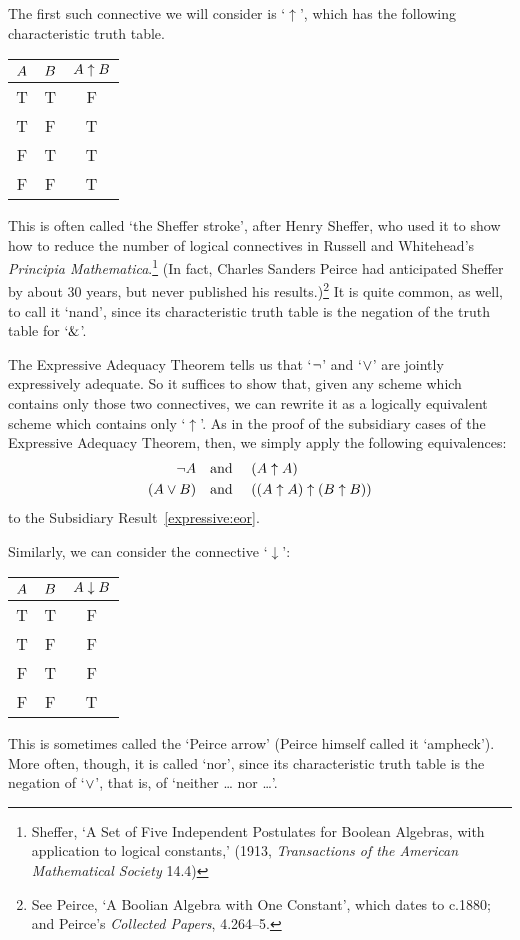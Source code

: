 The first such connective we will consider is `$\uparrow$', which has the following characteristic truth table.
\begin{center}
\begin{tabular}{c c | c}
$A$ & $B$ & $A \mathrel{\uparrow} B$\\
\hline
 T & T & F \\
 T & F & T \\
 F & T & T  \\
 F & F & T
\end{tabular}
\end{center}
 This is often called `the Sheffer stroke', after Henry Sheffer, who used it to show how to reduce the number of logical connectives in Russell and Whitehead's \emph{Principia Mathematica}.\footnote{Sheffer, `A Set of Five Independent Postulates for Boolean Algebras, with application to logical constants,' (1913, \emph{Transactions of the American Mathematical Society} 14.4)} (In fact, Charles Sanders Peirce had anticipated Sheffer by about 30 years, but never published his results.)\footnote{See Peirce, `A Boolian Algebra with One Constant', which dates to c.1880; and Peirce's \emph{Collected Papers}, 4.264--5.} It is quite common, as well, to call it `nand', since its characteristic truth table is the negation of the truth table for `$\mathbin{\&}$'.

The Expressive Adequacy Theorem tells us that `$\neg$' and `$\vee$' are jointly expressively adequate. So it suffices to show that, given any scheme which contains only those two connectives, we can rewrite it as a logically equivalent scheme which contains only `$\uparrow$'. As in the proof of the subsidiary cases of the Expressive Adequacy Theorem, then, we simply apply the following equivalences:
		\begin{align*}
			\neg A &\text{\quad and \quad} (A \uparrow A)\\
			(A \vee B) & \text{\quad and \quad} ((A \uparrow A) \uparrow (B \uparrow B))
		\end{align*}
to the Subsidiary Result~\ref{expressive:eor}.

Similarly, we can consider the connective `$\downarrow$':
\begin{center}
\begin{tabular}{c c | c}
$A$ & $B$ & $A \mathrel{\downarrow} B$\\
\hline
 T & T & F \\
 T & F & F  \\
 F & T & F  \\
 F & F & T
\end{tabular}
\end{center}
This is sometimes called the `Peirce arrow' (Peirce himself called it `ampheck'). More often, though, it is called `nor', since its characteristic truth table is the negation of `$\vee$', that is, of `neither \dots{} nor \dots'.

